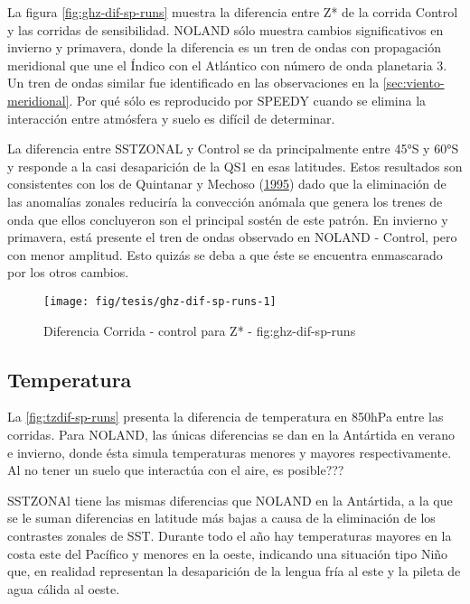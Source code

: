 \documentclass[spanish,a4paper]{book}
\begin{document}
La figura \autoref{fig:ghz-dif-sp-runs} muestra la diferencia entre Z*
de la corrida Control y las corridas de sensibilidad. NOLAND sólo
muestra cambios significativos en invierno y primavera, donde la
diferencia es un tren de ondas con propagación meridional que une el
Índico con el Atlántico con número de onda planetaria 3. Un tren de
ondas similar fue identificado en las observaciones en la
\autoref{sec:viento-meridional}. Por qué sólo es reproducido por SPEEDY
cuando se elimina la interacción entre atmósfera y suelo es difícil de
determinar.

La diferencia entre SSTZONAL y Control se da principalmente entre 45°S y
60°S y responde a la casi desaparición de la QS1 en esas latitudes.
Estos resultados son consistentes con los de Quintanar y Mechoso
(\protect\hyperlink{ref-Quintanar1995}{1995}) dado que la eliminación de
las anomalías zonales reduciría la convección anómala que genera los
trenes de onda que ellos concluyeron son el principal sostén de este
patrón. En invierno y primavera, está presente el tren de ondas
observado en NOLAND - Control, pero con menor amplitud. Esto quizás se
deba a que éste se encuentra enmascarado por los otros cambios.

\begin{figure*}
\texttt{[image: fig/tesis/ghz-dif-sp-runs-1]} \caption{Diferencia Corrida - control para Z* - fig:ghz-dif-sp-runs}\label{fig:ghz-dif-sp-runs}
\end{figure*}

\subsection{Temperatura}\label{temperatura-2}

La \autoref{fig:tzdif-sp-runs} presenta la diferencia de temperatura en
850hPa entre las corridas. Para NOLAND, las únicas diferencias se dan en
la Antártida en verano e invierno, donde ésta simula temperaturas
menores y mayores respectivamente. Al no tener un suelo que interactúa
con el aire, es posible???

SSTZONAl tiene las mismas diferencias que NOLAND en la Antártida, a la
que se le suman diferencias en latitude más bajas a causa de la
eliminación de los contrastes zonales de SST. Durante todo el año hay
temperaturas mayores en la costa este del Pacífico y menores en la
oeste, indicando una situación tipo Niño que, en realidad representan la
desaparición de la lengua fría al este y la pileta de agua cálida al
oeste.
\end{document}
